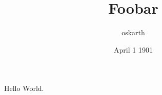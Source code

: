 \documentclass[12pt]{article}
\title{Foobar}
\author{oskarth}
\date{April 1 1901}
\begin{document}
\maketitle

Hello World.
\end{document}

